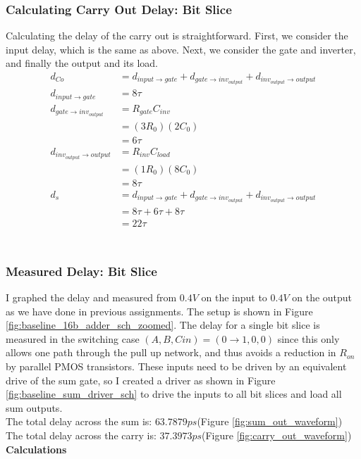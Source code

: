 \documentclass{article}
\begin{document}
\subsubsection{Calculating Carry Out Delay: Bit Slice}
Calculating the delay of the carry out is straightforward. First, we consider the input delay, which is the same as above. Next, we consider the gate and inverter, and finally the output and its load.
\begin{align*}
d_{Co} &= d_{input \rightarrow gate} + d_{gate \rightarrow inv_{output}} + d_{inv_{output} \rightarrow output}\\
d_{input \rightarrow gate} &= 8\tau\\
d_{gate \rightarrow inv_{output}} &= R_{gate}C_{inv}\\
&= (3R_0)(2C_0)\\
&= 6\tau\\
d_{inv_{output} \rightarrow output} &= R_{inv}C_{load}\\
&= (1R_0)(8C_0)\\
&=8\tau\\
d_{s} &= d_{input \rightarrow gate} + d_{gate \rightarrow inv_{output}} + d_{inv_{output} \rightarrow output}\\
&= 8\tau + 6\tau + 8\tau\\
&=22\tau\\
\end{align*}
\\

\subsubsection{Measured Delay: Bit Slice}
I graphed the delay and measured from $0.4V$ on the input to $0.4V$ on the output as we have done in previous assignments. The setup is shown in Figure \ref{fig:baseline_16b_adder_sch_zoomed}. The delay for a single bit slice is measured in the switching case $(A, B, Cin) = (0 \rightarrow 1, 0, 0)$ since this only allows one path through the pull up network, and thus avoids a reduction in $R_{on}$ by parallel PMOS transistors. These inputs need to be driven by an equivalent drive of the sum gate, so I created a driver as shown in Figure \ref{fig:baseline_sum_driver_sch} to drive the inputs to all bit slices and load all sum outputs.\\
The total delay across the sum is: $63.7879ps$(Figure \ref{fig:sum_out_waveform})\\
The total delay across the carry is: $37.3973ps$(Figure \ref{fig:carry_out_waveform})\\
\textbf{Calculations}\\
\end{document}
